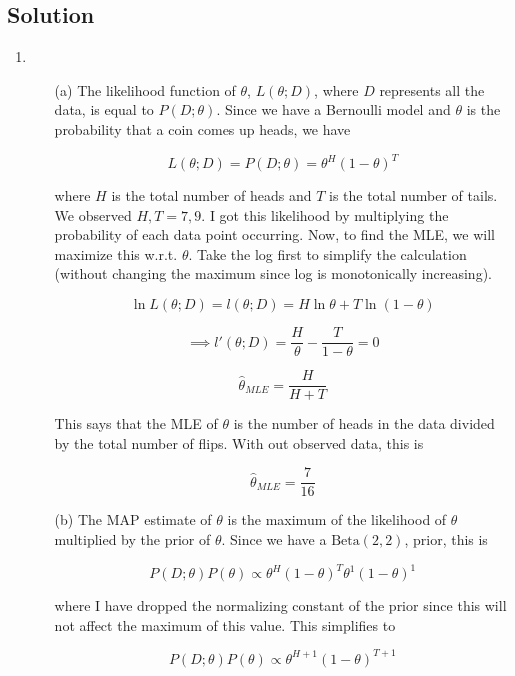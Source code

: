 \documentclass[submit]{harvardml}
\begin{document}
\subsection*{Solution}

\begin{enumerate}
    \item 
    \begin{enumerate}
        \item[(a)] The likelihood function of $\theta$, $L(\theta ;D)$, where $D$ represents all the data, is equal to $P(D ; \theta)$. Since we have a Bernoulli model and $\theta$ is the probability that a coin comes up heads, we have
        
        $$L(\theta ;D) = P(D ; \theta) = \theta^H(1-\theta)^T$$
        
        where $H$ is the total number of heads and $T$ is the total number of tails. We observed $H, T = 7, 9$. I got this likelihood by multiplying the probability of each data point occurring. Now, to find the MLE, we will maximize this w.r.t. $\theta$. Take the log first to simplify the calculation (without changing the maximum since log is monotonically increasing).
        
        $$\ln L(\theta ;D) = l(\theta ;D)= H\ln\theta + T\ln(1-\theta)$$
        
        $$ \implies l'(\theta ;D)= \frac{H}{\theta} - \frac{T}{1-\theta} = 0$$
        
        $$ \hat{\theta}_{MLE} = \frac{H}{H+T}$$
        
        This says that the MLE of $\theta$ is the number of heads in the data divided by the total number of flips. With out observed data, this is
        
        $$ \boxed{\hat{\theta}_{MLE} = \frac{7}{16}}$$
        
        \item[(b)] The MAP estimate of $\theta$ is the maximum of the likelihood of $\theta$ multiplied by the prior of $\theta$. Since we have a $\textrm{Beta}(2,2)$, prior, this is
        
        $$ P(D ; \theta)P(\theta) \propto \theta^H(1-\theta)^T \theta^1(1-\theta)^1 $$
        
        where I have dropped the normalizing constant of the prior since this will not affect the maximum of this value. This simplifies to 
        
        $$ P(D ; \theta)P(\theta) \propto \theta^{H+1}(1-\theta)^{T+1}$$
        

\end{enumerate}
\end{enumerate}
\end{document}
